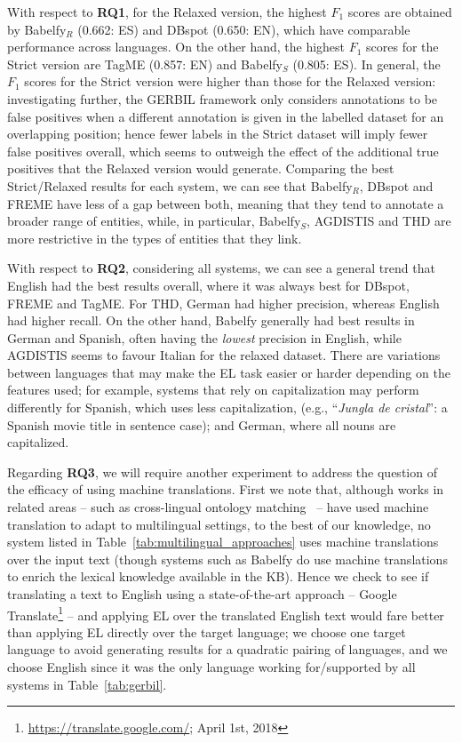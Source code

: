 \documentclass{llncs}
\begin{document}
With respect to \textbf{RQ1}, for the Relaxed version, the highest $F_1$ scores are obtained by Babelfy$_R$ (0.662: ES) and DBspot (0.650: EN), which have comparable performance across languages. On the other hand, the highest $F_1$ scores for the Strict version are TagME (0.857: EN) and Babelfy$_S$ (0.805: ES). In general, the $F_1$ scores for the Strict version were higher than those for the Relaxed version: investigating further, the GERBIL framework only considers annotations to be false positives when a different annotation is given in the labelled dataset for an overlapping position; hence fewer labels in the Strict dataset will imply fewer false positives overall, which seems to outweigh the effect of the additional true positives that the Relaxed version would generate. Comparing the best Strict/Relaxed results for each system, we can see that Babelfy$_R$, DBspot and FREME have less of a gap between both, meaning that they tend to annotate a broader range of entities, while, in particular, Babelfy$_S$, AGDISTIS and THD are more restrictive in the types of entities that they link.

With respect to \textbf{RQ2}, considering all systems, we can see a general trend that English had the best results overall, where it was always best for DBspot, FREME and TagME. For THD, German had higher precision, whereas English had higher recall. On the other hand, Babelfy generally had best results in German and Spanish, often having the \textit{lowest} precision in English, while AGDISTIS seems to favour Italian for the relaxed dataset. There are variations between languages that may make the EL task easier or harder depending on the features used; for example, systems that rely on capitalization may perform differently for Spanish, which uses less capitalization, (e.g., ``\textit{Jungla de cristal}'': a Spanish movie title in sentence case); and German, where all nouns are capitalized.
\medskip

Regarding \textbf{RQ3}, we will require another experiment to address the question of the efficacy of using machine translations. First we note that, although works in related areas -- such as cross-lingual ontology matching~\cite{FuBO10} -- have used machine translation to adapt to multilingual settings, to the best of our knowledge, no system listed in Table~\ref{tab:multilingual_approaches} uses machine translations over the input text (though systems such as Babelfy do use machine translations to enrich the lexical knowledge available in the KB). Hence we check to see if translating a text to English using a state-of-the-art approach -- Google Translate\footnote{\url{https://translate.google.com/}; April 1st, 2018} -- and applying EL over the translated English text would fare better than applying EL directly over the target language; we choose one target language to avoid generating results for a quadratic pairing of languages, and we choose English since it was the only language working for/supported by all systems in Table~\ref{tab:gerbil}.
\end{document}
